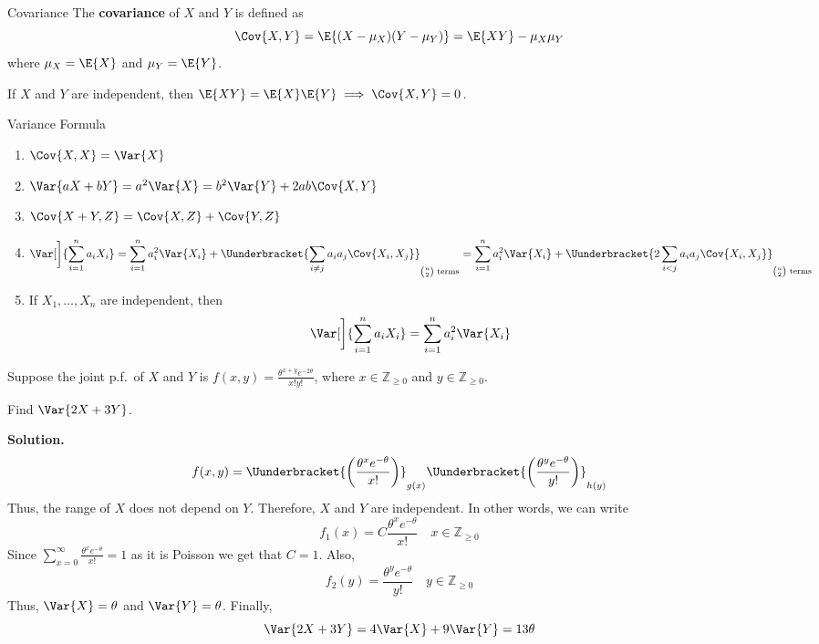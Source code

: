 \begin{Definition}{Covariance}{}
    The \textbf{covariance} of $ X $ and $ Y $ is defined as
    \[ \Cov{X,Y}=\E{(X-\mu_X)(Y-\mu_Y)}=\E{XY}-\mu_X\mu_Y \]
    where $ \mu_X=\E{X} $ and $ \mu_Y=\E{Y} $.
\end{Definition}
\begin{Proposition}{}{}
    If $ X $ and $ Y $ are independent, then $ \E{XY}=\E{X}\E{Y}
        \implies \Cov{X,Y}=0 $.
\end{Proposition}
\begin{Theorem}{Variance Formula}{}
    \begin{enumerate}[label=(\arabic*)]
        \item $ \Cov{X,X}=\Var{X} $
        \item $ \Var{aX+bY}=a^2\Var{X}=b^2\Var{Y}+2ab\Cov{X,Y} $
        \item $ \Cov{X+Y,Z}=\Cov{X,Z}+\Cov{Y,Z} $
        \item \[ \Var[\bigg]{\sum_{i=1}^{n} a_i X_i}=
                  \sum_{i=1}^{n} a_i^2 \Var{X_i}+\Uunderbracket{\sum_{i\neq j}a_i a_j\Cov{X_i,X_j}}_{\binom{n}{2}\text{ terms}}=
                  \sum_{i=1}^{n} a_i^2\Var{X_i}
                  +\Uunderbracket{2\sum_{i<j}a_i a_j\Cov{X_i,X_j}}_{\binom{n}{2}\text{ terms}} \]
        \item If $ X_1,\ldots,X_n $ are independent, then
              \[ \Var[\bigg]{\sum_{i=1}^{n} a_i X_i}=\sum_{i=1}^{n} a_i^2\Var{X_i} \]
    \end{enumerate}
\end{Theorem}
\begin{Example}{}{}
    Suppose the joint p.f.\ of $ X $ and $ Y $ is
    $ \displaystyle f(x,y)=\frac{\theta^{x+y}e^{-2\theta}}{x!y!} $,
    where $ x\in\mathbb{Z}_{\geqslant 0} $ and $ y\in\mathbb{Z}_{\geqslant 0} $.

    Find $ \Var{2X+3Y} $.

    \textbf{Solution.}
    \[ f(x,y)=\Uunderbracket{\left( \frac{\theta^x e^{-\theta}}{x!} \right)}_{g(x)}
        \Uunderbracket{\left( \frac{\theta^y e^{-\theta}}{y!} \right)}_{h(y)} \]
    Thus, the range of $ X $ does not depend on $ Y $. Therefore,
    $ X $ and $ Y $ are independent. In other words, we can write
    \[ f_1(x)=C \frac{\theta^x e^{-\theta}}{x!} \quad x\in\mathbb{Z}_{\geqslant 0}\]
    Since $ \displaystyle \sum_{x=0}^{\infty} \frac{\theta^x e^{-\theta}}{x!} =1 $
    as it is Poisson we get that $ C=1 $. Also,
    \[ f_2(y)=\frac{\theta^y e^{-\theta}}{y!}\quad y\in\mathbb{Z}_{\geqslant 0} \]
    Thus, $ \Var{X}=\theta $ and $ \Var{Y}=\theta $. Finally,
    \[ \Var{2X+3Y}=4\Var{X}+9\Var{Y}=13\theta \]
\end{Example}
